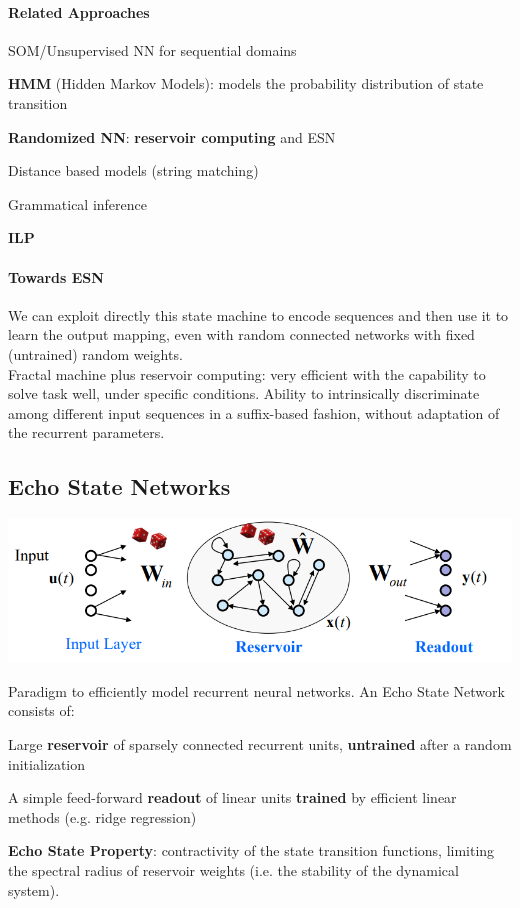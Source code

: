 \documentclass[10pt]{report}
\begin{document}
\paragraph{Related Approaches} \begin{list}{}{}
	\item SOM/Unsupervised NN for sequential domains
	\item \textbf{HMM} (Hidden Markov Models): models the probability distribution of state transition
	\item \textbf{Randomized NN}: \textbf{reservoir computing} and ESN
	\item Distance based models (string matching)
	\item Grammatical inference
	\item \textbf{ILP}
\end{list}
\paragraph{Towards ESN} We can exploit directly this state machine to encode sequences and then use it to learn the output mapping, even with random connected networks with fixed (untrained) random weights.\\
Fractal machine plus reservoir computing: very efficient with the capability to solve task well, under specific conditions. Ability to intrinsically discriminate among different input sequences in a suffix-based fashion, without adaptation of the recurrent parameters.
\subsection{Echo State Networks}
\begin{center}
	\includegraphics[scale=0.5]{39.png}
\end{center}
Paradigm to efficiently model recurrent neural networks. An Echo State Network consists of:
\begin{list}{}{}
	\item Large \textbf{reservoir} of sparsely connected recurrent units, \textbf{untrained} after a random initialization
	\item A simple feed-forward \textbf{readout} of linear units \textbf{trained} by efficient linear methods (e.g. ridge regression)
\end{list}
\textbf{Echo State Property}: contractivity of the state transition functions, limiting the spectral radius of reservoir weights (i.e. the stability of the dynamical system).
\end{document}
